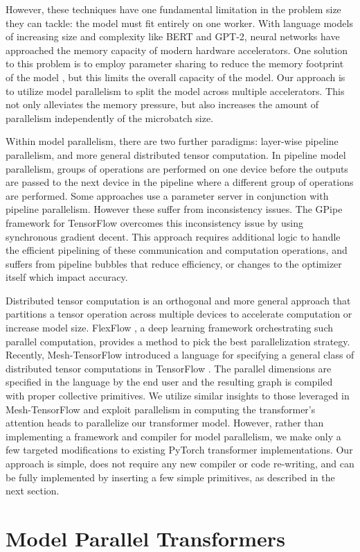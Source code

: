\documentclass{article}
\begin{document}
However, these techniques have one fundamental limitation in the problem size they can tackle: the model must fit entirely on one worker. With language models of increasing size and complexity like BERT and GPT-2, neural networks have approached the memory capacity of modern hardware accelerators. One solution to this problem is to employ parameter sharing to reduce the memory footprint of the model \cite{ALBERT2019}, but this limits the overall capacity of the model. Our approach is to utilize model parallelism to split the model across multiple accelerators. This not only alleviates the memory pressure, but also increases the amount of parallelism independently of the microbatch size.

Within model parallelism, there are two further paradigms: layer-wise pipeline parallelism, and more general distributed tensor computation. In pipeline model parallelism, groups of operations are performed on one device before the outputs are passed to the next device in the pipeline where a different group of operations are performed. Some approaches \cite{PipeDream2018, DualPipe2018} use a parameter server \cite{ParamServer2014} in conjunction with pipeline parallelism. However these suffer from inconsistency issues. The GPipe framework for TensorFlow \cite{GPipe} overcomes this inconsistency issue by using synchronous gradient decent. This approach requires additional logic to handle the efficient pipelining of these communication and computation operations, and suffers from pipeline bubbles that reduce efficiency, or changes to the optimizer itself which impact accuracy.

Distributed tensor computation is an orthogonal and more general approach that partitions a tensor operation across multiple devices to accelerate computation or increase model size. FlexFlow \cite{FlexFlow2018}, a deep learning framework orchestrating such parallel computation, provides a method to pick the best parallelization strategy. Recently, Mesh-TensorFlow \cite{mesh_tf} introduced a language for specifying a general class of distributed tensor computations in TensorFlow \cite{tensorflow2015-whitepaper}. The parallel dimensions are specified in the language by the end user and the resulting graph is compiled with proper collective primitives. We utilize similar insights to those leveraged in Mesh-TensorFlow and exploit parallelism in computing the transformer's attention heads to parallelize our transformer model. However, rather than implementing a framework and compiler for model parallelism, we make only a few targeted modifications to existing PyTorch transformer implementations. Our approach is simple, does not require any new compiler or code re-writing, and can be fully implemented by inserting a few simple primitives, as described in the next section. \section{Model Parallel Transformers} 
\label{model_par}
\end{document}
